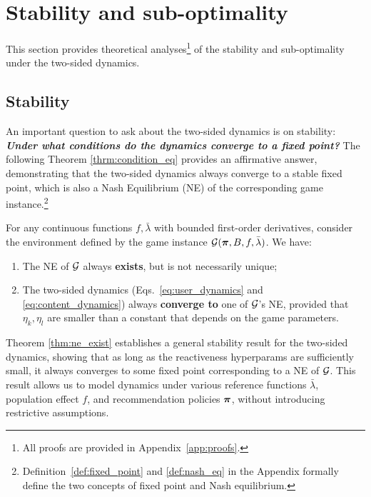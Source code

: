 \section{Stability and sub-optimality}

This section provides theoretical analyses\footnote{All proofs are provided in Appendix~\ref{app:proofs}.} of the stability and sub-optimality under the two-sided dynamics.


\subsection{Stability} 
An important question to ask about the two-sided dynamics is on stability: \textbf{\textit{Under what conditions do the dynamics converge to a fixed point?}} The following Theorem \ref{thrm:condition_eq} provides an affirmative answer, demonstrating that the two-sided dynamics always converge to a stable fixed point, which is also a Nash Equilibrium (NE) \citep{nash1950equilibrium} of the corresponding game instance.\footnote{Definition~\ref{def:fixed_point} and \ref{def:nash_eq} in the Appendix formally define the two concepts of fixed point and Nash equilibrium.}

\begin{theorem}\label{thm:ne_exist}
    For any continuous functions $f, \bar{\lambda}$ with bounded first-order derivatives, consider the environment defined by the game instance $\mathcal{G}(\bm{\pi}, B, f, \bar{\lambda})$. We have:
    \begin{enumerate}[leftmargin=12pt]
        \item The NE of $\mathcal{G}$ always \textbf{exists}, but is not necessarily unique;
        \item The two-sided dynamics (Eqs.~\eqref{eq:user_dynamics} and \eqref{eq:content_dynamics}) always \textbf{converge to} one of $\mathcal{G}$'s NE, provided that $\eta_k, \eta_l$ are smaller than a constant that depends on the game parameters.
    \end{enumerate}
\end{theorem}

Theorem \ref{thm:ne_exist} establishes a general stability result for the two-sided dynamics, showing that as long as the reactiveness hyperparams are sufficiently small, it always converges to some fixed point corresponding to a NE of $\mathcal{G}$. This result allows us to model dynamics under various reference functions $\bar{\lambda}$, population effect $f$, and recommendation policies $\bm{\pi}$, without introducing restrictive assumptions.

